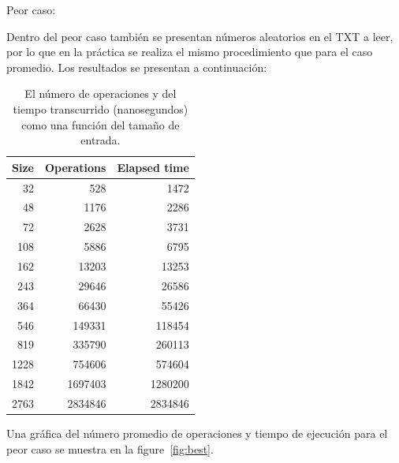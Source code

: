 Peor caso: 

Dentro del peor caso también se presentan números aleatorios en el TXT a leer, por lo que en la práctica se realiza el mismo procedimiento que para el caso promedio. Los resultados se presentan a continuación: 


\begin{table}[H]	%
	\centering	%
	\caption{
		El número de operaciones y del tiempo transcurrido (nanosegundos) como una función del tamaño de entrada.
	}	%

	\begin{tabular}{r r r}
		Size & Operations & Elapsed time \\
		\hline
		32 & 528 &  1472 \\
		48 & 1176 &  2286 \\
		72& 2628 &  3731 \\
		108& 5886 & 6795 \\
		162& 13203&  13253 \\
	    243 & 29646 & 26586 \\
	    364 & 66430 & 55426 \\
	    546 & 149331 & 118454 \\
	    819 & 335790 & 260113 \\
	    1228 & 754606 & 574604 \\
	    1842 & 1697403 & 1280200 \\
	    2763 & 2834846 & 2834846 \\
	        
	\end{tabular}

\end{table}


Una gráfica del número promedio de operaciones y tiempo de ejecución para el peor caso se muestra en la figure~\ref{fig:best}.

